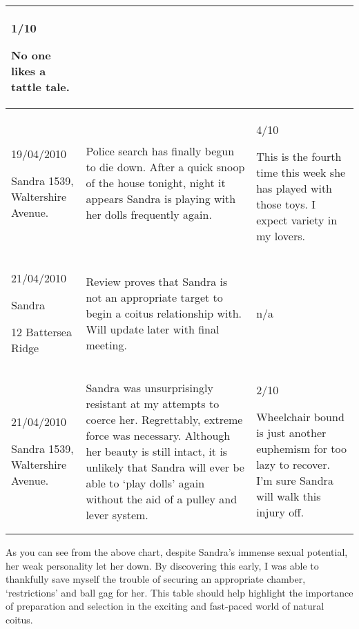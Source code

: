 \begin{longtable}{| p{} | p{} | p{} |}
1/10

No one likes a tattle tale.

\\
\hline

19/04/2010

Sandra
1539, Waltershire Avenue.
        
&

Police search has finally begun to die down. After a quick snoop of the house 
tonight, night it appears Sandra is playing with her dolls frequently again.
  
&
     

4/10

This is the fourth time this week she has played with those toys. I expect 
variety in my lovers.

\\
\hline

21/04/2010

Sandra

12 Battersea Ridge
       
 &

Review proves that Sandra is not an appropriate target to begin a coitus 
relationship with. Will update later with final meeting.
      
  &

n/a

\\
\hline

21/04/2010


Sandra
1539, Waltershire Avenue.
        
&

Sandra was unsurprisingly resistant at my attempts to coerce her. Regrettably, 
extreme force was necessary. Although her beauty is still intact, it is unlikely 
that Sandra will ever be able to ‘play dolls’ again without the aid of a pulley 
and lever system.
&    

2/10

Wheelchair bound is just another euphemism for too lazy to recover. I’m sure 
Sandra will walk this injury off.

\\
\hline
\end{longtable}

As you can see from the above chart, despite Sandra’s immense sexual potential, 
her weak personality let her down. By discovering this early, I was able to 
thankfully save myself the trouble of securing an appropriate chamber, 
‘restrictions’ and ball gag for her. This table should help highlight the 
importance of preparation and selection in the exciting and fast-paced world of 
natural coitus.